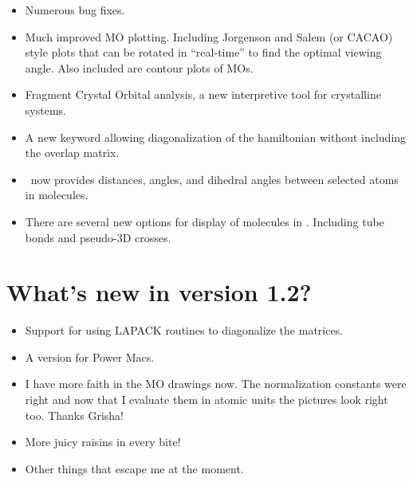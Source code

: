 \begin{itemize}

\item Numerous bug fixes.

\item Much improved MO plotting.  Including Jorgenson and
Salem (or CACAO) style plots that can be rotated in ``real-time'' to
find the optimal viewing angle.  Also included are contour plots
of MOs.

\item Fragment Crystal Orbital analysis, a new interpretive tool
for crystalline systems.

\item A new keyword allowing diagonalization of the hamiltonian
without including the overlap matrix.

\item \viewprog\ now provides distances, angles, and dihedral angles
between selected atoms in molecules.

\item There are several new options for display of molecules in
\viewprog.  Including tube bonds and pseudo-3D crosses.



\end{itemize}


\chapter{What's new in version 1.2?}

\begin{itemize}

\item Support for using LAPACK routines to diagonalize the matrices. 

\item A version for Power Macs.

\item I have more faith in the MO drawings now.  The normalization
constants were right and now that I evaluate them in atomic units the
pictures look right too.  Thanks Grisha!

\item More juicy raisins in every bite!

\item Other things that escape me at the moment.

\end{itemize}



